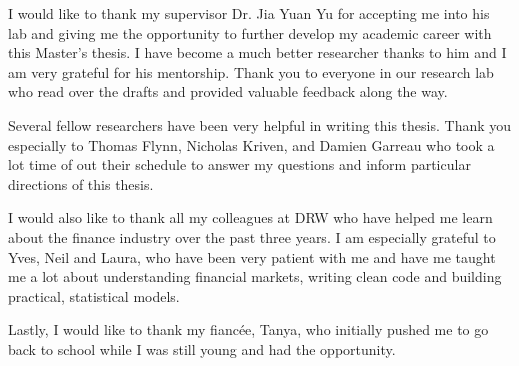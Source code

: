 \begin{acknowledgments}
  
I would like to thank my supervisor Dr. Jia Yuan Yu for accepting me into his lab and giving me the opportunity to further develop my academic career with this Master's thesis. I have become a much better researcher thanks to him and I am very grateful for his mentorship. Thank you to everyone in our research lab who read over the drafts and provided valuable feedback along the way.
  
Several fellow researchers have been very helpful in writing this thesis. Thank you especially to Thomas Flynn, Nicholas Kriven,  and Damien Garreau who took a lot time of out their schedule to answer my questions and inform particular directions of this thesis.
  
I would also like to thank all my colleagues at DRW who have helped me learn about the finance industry over the past three years. I am especially grateful to Yves, Neil and Laura, who have been very patient with me and have me taught me a lot about understanding financial markets, writing clean code and building practical, statistical models.
  
Lastly, I would like to thank my fiancée, Tanya, who initially pushed me to go back to school while I was still young and had the opportunity. 
\end{acknowledgments}
